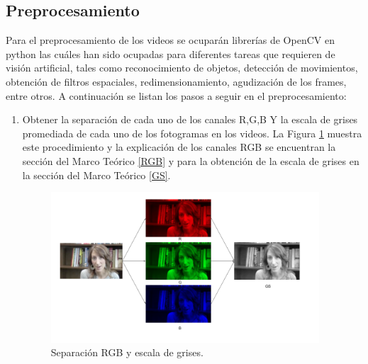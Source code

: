 \begin{onehalfspacing}
\subsection{Preprocesamiento}
\label{sec:Preprocesamiento}
Para el preprocesamiento de los videos se ocuparán librerías de OpenCV en python las cuáles han sido ocupadas para diferentes tareas que requieren de visión artificial, tales como reconocimiento de objetos, detección de movimientos, obtención de filtros espaciales, redimensionamiento, agudización de los frames, entre otros. A continuación se listan los pasos a seguir en el preprocesamiento:


\begin{enumerate}
    \item Obtener la separación de cada uno de los canales R,G,B Y la escala de grises promediada de cada uno de los fotogramas en los videos. La Figura \ref{fig:Fig_Dataset1_RGB_GS} muestra este procedimiento y la explicación de los canales RGB se encuentran la sección del Marco Teórico \ref{RGB} y para la obtención de la escala de grises en la sección del Marco Teórico \ref{GS}.
    \begin{figure}[h!]
    	\centering
    	\includegraphics[width=10cm,keepaspectratio]{XX_Figures/Fig_Dataset1_RGB_GS.png}
    	\caption{\footnotesize Separación RGB y escala de grises.}
    	\label{fig:Fig_Dataset1_RGB_GS}
    \end{figure}
    

\end{enumerate}
\end{onehalfspacing}
